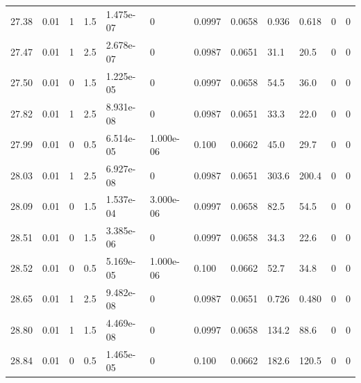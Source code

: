 \documentclass[preview]{standalone}
\begin{document}
{{{{{{\begin{tabular}{L{1.2cm}C{1.2cm} C{0.3cm}C{0.5cm} C{1.4cm}C{1.4cm} C{1.4cm}C{1.4cm} C{1.6cm}C{1.6cm} C{1.6cm}C{1.6cm}}
  27.38  &  0.01  & 1     & 1.5 &  1.475e-07  & 0  &  0.0997&   0.0658& 0.936 & 0.618   &  0 & 0  \\ 
  27.47  &  0.01  & 1     & 2.5 &  2.678e-07  & 0  &  0.0987&   0.0651& 31.1 & 20.5   &  0 & 0  \\ 
  27.50  &  0.01  & 0     & 1.5 &  1.225e-05  & 0  &  0.0997&   0.0658& 54.5 & 36.0   &  0 & 0  \\ 
  27.82  &  0.01  & 1     & 2.5 &  8.931e-08  & 0  &  0.0987&   0.0651& 33.3 & 22.0   &  0 & 0  \\ 
  27.99  &  0.01  & 0     & 0.5 &  6.514e-05  & 1.000e-06  &  0.100&   0.0662& 45.0 & 29.7   &  0 & 0  \\ 
  28.03  &  0.01  & 1     & 2.5 &  6.927e-08  & 0  &  0.0987&   0.0651& 303.6 & 200.4   &  0 & 0  \\ 
  28.09  &  0.01  & 0     & 1.5 &  1.537e-04  & 3.000e-06  &  0.0997&   0.0658& 82.5 & 54.5   &  0 & 0  \\ 
  28.51  &  0.01  & 0     & 1.5 &  3.385e-06  & 0  &  0.0997&   0.0658& 34.3 & 22.6   &  0 & 0  \\ 
  28.52  &  0.01  & 0     & 0.5 &  5.169e-05  & 1.000e-06  &  0.100&   0.0662& 52.7 & 34.8   &  0 & 0  \\ 
  28.65  &  0.01  & 1     & 2.5 &  9.482e-08  & 0  &  0.0987&   0.0651& 0.726 & 0.480   &  0 & 0  \\ 
  28.80  &  0.01  & 1     & 1.5 &  4.469e-08  & 0  &  0.0997&   0.0658& 134.2 & 88.6   &  0 & 0  \\ 
  28.84  &  0.01  & 0     & 0.5 &  1.465e-05  & 0  &  0.100&   0.0662& 182.6 & 120.5   &  0 & 0  \\ 
\hline 
\end{tabular} 

}}}}}}
\end{document}
